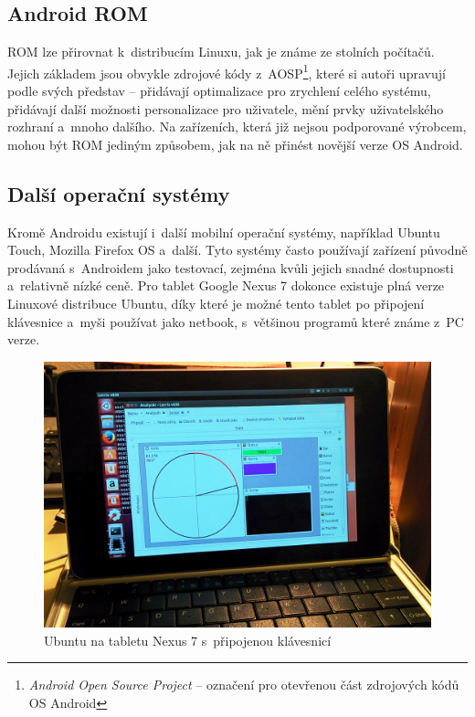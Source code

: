 \documentclass[12pt, a4paper, oneside]{article}
\newcommand{\It}{\textit}  %
\begin{document}
\subsection{Android ROM}
ROM lze přirovnat k~distribucím Linuxu, jak je známe ze stolních počítačů. Jejich základem jsou obvykle zdrojové kódy z~AOSP\cite{aosp}\footnote{\It{Android Open Source Project} -- označení pro otevřenou část zdrojových kódů OS Android}, které si autoři upravují podle svých představ -- přidávají optimalizace pro zrychlení celého systému, přidávají další možnosti personalizace pro uživatele, mění prvky uživatelského rozhraní a~mnoho dalšího. Na zařízeních, která již nejsou podporované výrobcem, mohou být ROM jediným způsobem, jak na ně přinést novější verze OS Android.

\subsection{Další operační systémy}
Kromě Androidu existují i~další mobilní operační systémy, například Ubuntu Touch\cite{utouch}, Mozilla Firefox OS\cite{firefoxos} a~další. Tyto systémy často používají zařízení původně prodávaná s~Androidem jako testovací, zejména kvůli jejich snadné dostupnosti a~relativně nízké ceně. Pro tablet Google Nexus 7 dokonce existuje plná verze Linuxové distribuce Ubuntu, díky které je možné tento tablet po připojení klávesnice a~myši používat jako netbook, s~většinou programů které známe z~PC verze.

\begin{figure}[H]
\begin{center}
\includegraphics[width=\textwidth]{../img/n7_ubuntu.jpg}
\caption{Ubuntu na tabletu Nexus 7 s~připojenou klávesnicí}
\end{center}
\end{figure}
\end{document}
